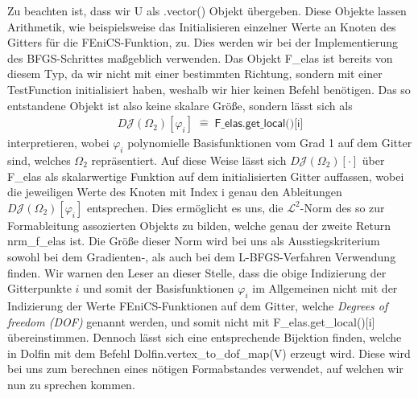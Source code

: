 \documentclass[bibliography=totoc,12pt,a4paper]{scrartcl}
\theoremstyle{exampstyle}
\numberwithin{equation}{section}
\begin{document}
Zu beachten ist, dass wir \textsf{U} als \textsf{.vector()} Objekt übergeben. Diese Objekte lassen Arithmetik, wie beispielsweise das Initialisieren einzelner Werte an Knoten des Gitters für die FEniCS-Funktion, zu. Dies werden wir bei der Implementierung des BFGS-Schrittes maßgeblich verwenden. Das Objekt \textsf{F\_elas} ist bereits von diesem Typ, da wir nicht mit einer bestimmten Richtung, sondern mit einer \textsf{TestFunction} initialisiert haben, weshalb wir hier keinen Befehl benötigen. Das so entstandene Objekt ist also keine skalare Größe, sondern lässt sich als
\begin{align}\label{felas}
	D\mathcal{J}(\Omega_2)[\varphi_i] \; \hat{=}\; \textsf{F\_elas.get\_local()[i]}
\end{align}
interpretieren, wobei $\varphi_i$ polynomielle Basisfunktionen vom Grad 1 auf dem Gitter sind, welches $\Omega_2$ repräsentiert. Auf diese Weise lässt sich $D\mathcal{J}(\Omega_2)[\cdot]$ über \textsf{F\_elas} als skalarwertige Funktion auf dem initialisierten Gitter auffassen, wobei die jeweiligen Werte des Knoten mit Index \textsf{i} genau den Ableitungen $D\mathcal{J}(\Omega_2)[\varphi_i]$ entsprechen. Dies ermöglicht es uns, die $\mathcal{L}^2$-Norm des so zur Formableitung assozierten Objekts zu bilden, welche genau der zweite Return \textsf{nrm\_f\_elas} ist. 
Die Größe dieser Norm wird bei uns als Ausstiegskriterium sowohl bei dem Gradienten-, als auch bei dem L-BFGS-Verfahren Verwendung finden.
Wir warnen den Leser an dieser Stelle, dass die obige Indizierung der Gitterpunkte $i$ und somit der Basisfunktionen $\varphi_i$ im Allgemeinen nicht mit der Indizierung der Werte FEniCS-Funktionen auf dem Gitter, welche \textit{Degrees of freedom (DOF)} genannt werden, und somit nicht mit \textsf{F\_elas.get\_local()[i]} übereinstimmen. Dennoch lässt sich eine entsprechende Bijektion finden, welche in \textsf{Dolfin} mit dem Befehl \textsf{Dolfin.vertex\_to\_dof\_map(V)} erzeugt wird. Diese wird bei uns zum berechnen eines nötigen Formabstandes verwendet, auf welchen wir nun zu sprechen kommen.
\end{document}
